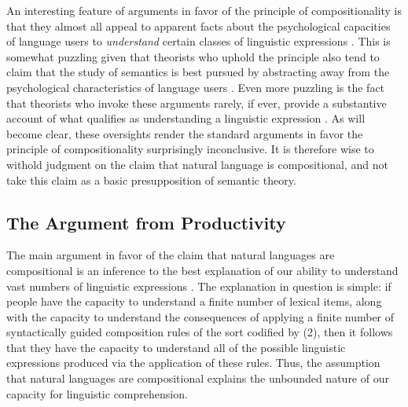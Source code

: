 An interesting feature of arguments in favor of the principle of compositionality is that they almost all appeal to apparent facts about the psychological capacities of language users to \textit{understand} certain classes of linguistic expressions \citep{Szabo:2013}. This is somewhat puzzling given that theorists who uphold the principle also tend to claim that the study of semantics is best pursued by abstracting away from the psychological characteristics of language users \citep[e.g.][]{Speaks:2014,Lewis:1970,Lewis:1975,Carpenter:1997}. Even more puzzling is the fact that theorists who invoke these arguments rarely, if ever, provide a substantive account of what qualifies as understanding a linguistic expression \citep{Szabo:2013}. As will become clear, these oversights render the standard arguments in favor the principle of compositionality surprisingly inconclusive. It is therefore wise to withold judgment on the claim that natural language is compositional, and not take this claim as a basic presupposition of semantic theory.

\subsection{The Argument from Productivity}

The main argument in favor of the claim that natural languages are compositional is an inference to the best explanation of our ability to understand vast numbers of linguistic expressions \citep{FodorPylyshyn:1988}. The explanation in question is simple: if people have the capacity to understand a finite number of lexical items, along with the capacity to understand the consequences of applying a finite number of syntactically guided composition rules of the sort codified by (2), then it follows that they have the capacity to understand all of the possible linguistic expressions produced via the application of these rules. Thus, the assumption that natural languages are compositional explains the unbounded nature of our capacity for linguistic comprehension.

